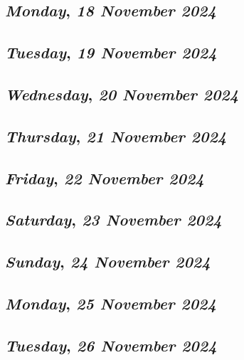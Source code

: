 \def\day{\textit{18 November 2024}}
\def\weekday{\textit{Monday}}
\subsection*{\weekday, \day}

\def\day{\textit{19 November 2024}}
\def\weekday{\textit{Tuesday}}
\subsection*{\weekday, \day}

\def\day{\textit{20 November 2024}}
\def\weekday{\textit{Wednesday}}
\subsection*{\weekday, \day}

\def\day{\textit{21 November 2024}}
\def\weekday{\textit{Thursday}}
\subsection*{\weekday, \day}

\def\day{\textit{22 November 2024}}
\def\weekday{\textit{Friday}}
\subsection*{\weekday, \day}

\def\day{\textit{23 November 2024}}
\def\weekday{\textit{Saturday}}
\subsection*{\weekday, \day}

\def\day{\textit{24 November 2024}}
\def\weekday{\textit{Sunday}}
\subsection*{\weekday, \day}

\def\day{\textit{25 November 2024}}
\def\weekday{\textit{Monday}}
\subsection*{\weekday, \day}

\def\day{\textit{26 November 2024}}
\def\weekday{\textit{Tuesday}}
\subsection*{\weekday, \day}


